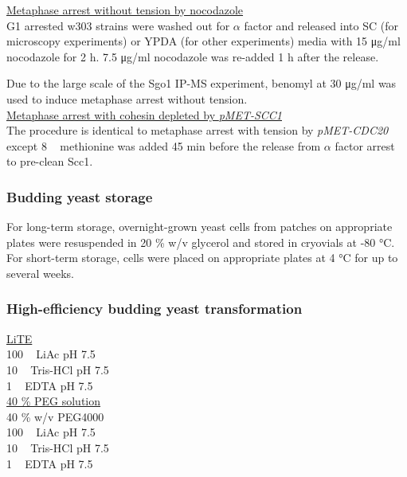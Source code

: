 \underline{Metaphase arrest without tension by nocodazole}\\
G1 arrested w303 strains were washed out for $\alpha$ factor and released into SC (for microscopy experiments) or YPDA (for other experiments) media with 15 \si{\micro\gram/\milli\litre} nocodazole for 2 \si{\hour}. 7.5 \si{\micro\gram/\milli\litre} nocodazole was re-added 1 \si{\hour} after the release.

Due to the large scale of the Sgo1 IP-MS experiment, benomyl at 30 \si{\micro\gram/\milli\litre} was used to induce metaphase arrest without tension. \\

\underline{Metaphase arrest with cohesin depleted by \textit{pMET-SCC1}}\\
The procedure is identical to metaphase arrest with tension by \textit{pMET-CDC20} except 8 \si{\milli\Molar} methionine was added 45 \si{\minute} before the release from $\alpha$ factor arrest to pre-clean Scc1. \\

\subsubsection{Budding yeast storage}
For long-term storage, overnight-grown yeast cells from patches on appropriate plates were resuspended in 20 \% w/v glycerol and stored in cryovials at -80 \si{\celsius}. For short-term storage, cells were placed on appropriate plates at 4 \si{\celsius} for up to several weeks.

\subsubsection{High-efficiency budding yeast transformation}

\underline{LiTE}\\
100 \si{\milli\Molar} LiAc pH 7.5 \\
10 \si{\milli\Molar} Tris-HCl pH 7.5 \\ 
1 \si{\milli\Molar} EDTA pH 7.5 \\

\underline{40 \% PEG solution}\\
40 \% w/v PEG4000\\
100 \si{\milli\Molar} LiAc pH 7.5\\
10 \si{\milli\Molar} Tris-HCl pH 7.5\\
1 \si{\milli\Molar} EDTA pH 7.5\\

